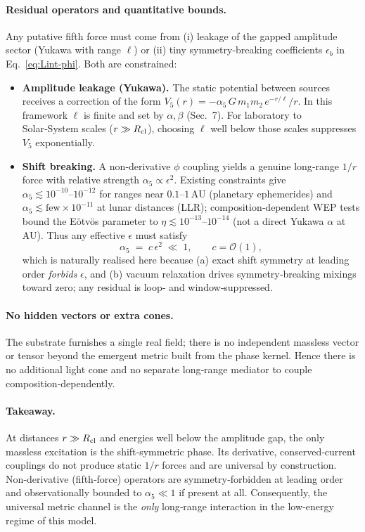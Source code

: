 \documentclass[11pt]{article}
\begin{document}
\paragraph{Residual operators and quantitative bounds.} Any putative fifth force must come from (i) leakage of the gapped amplitude sector (Yukawa with range $\ell$) or (ii) tiny symmetry‑breaking coefficients $\epsilon_b$ in Eq.~\eqref{eq:Lint-phi}. Both are constrained:
\begin{itemize}[leftmargin=*]
  \item \textbf{Amplitude leakage (Yukawa).} The static potential between sources receives a correction of the form $V_5(r)= -\alpha_5\, G\,m_1 m_2\, e^{-r/\ell}/r$. In this framework $\ell$ is finite and set by $\alpha,\beta$ (Sec.~7). For laboratory to Solar‑System scales ($r\gg R_{\rm cl}$), choosing $\ell$ well below those scales suppresses $V_5$ exponentially.
  \item \textbf{Shift breaking.} A non‑derivative $\phi$ coupling yields a genuine long‑range $1/r$ force with relative strength $\alpha_5\propto \epsilon^2$. Existing constraints give $\alpha_5\lesssim 10^{-10}\text{--}10^{-12}$ for ranges near $0.1$--$1\,\text{AU}$ (planetary ephemerides) and $\alpha_5\lesssim \text{few}\times 10^{-11}$ at lunar distances (LLR); composition‑dependent WEP tests bound the Eötvös parameter to $\eta\lesssim 10^{-13}\text{--}10^{-14}$ (not a direct Yukawa $\alpha$ at AU). Thus any effective $\epsilon$ must satisfy
  \begin{equation}
    \alpha_5 \;=\; c\, \epsilon^2 \;\ll\; 1,\qquad c=\mathcal O(1),
  \end{equation}
  which is naturally realised here because (a) exact shift symmetry at leading order \emph{forbids} $\epsilon$, and (b) vacuum relaxation drives symmetry‑breaking mixings toward zero; any residual is loop‑ and window‑suppressed.
\end{itemize}

\paragraph{No hidden vectors or extra cones.} The substrate furnishes a single real field; there is no independent massless vector or tensor beyond the emergent metric built from the phase kernel. Hence there is no additional light cone and no separate long‑range mediator to couple composition‑dependently.

\paragraph{Takeaway.} At distances $r\gg R_{\rm cl}$ and energies well below the amplitude gap, the only massless excitation is the shift‑symmetric phase. Its derivative, conserved‑current couplings do not produce static $1/r$ forces and are universal by construction. Non‑derivative (fifth‑force) operators are symmetry‑forbidden at leading order and observationally bounded to $\alpha_5\!\ll\!1$ if present at all. Consequently, the universal metric channel is the \emph{only} long‑range interaction in the low‑energy regime of this model.
\end{document}
